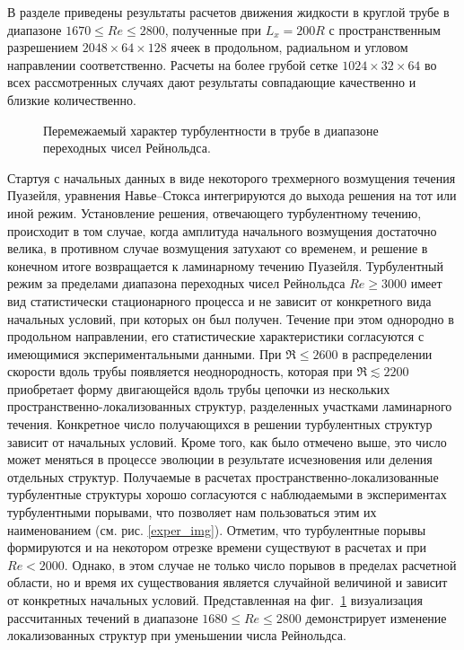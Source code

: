 В разделе приведены результаты расчетов движения жидкости в круглой трубе в диапазоне $1670\leqslant Re\leqslant 2800$, полученные при $L_x=200R$ с пространственным разрешением $2048 \times 64 \times 128$ ячеек в продольном, радиальном и угловом направлении соответственно. Расчеты на более грубой сетке $1024 \times 32 \times 64$ во всех рассмотренных случаях дают результаты совпадающие качественно и близкие количественно.

\begin{figure}[h]
\caption{Перемежаемый характер турбулентности в трубе в диапазоне переходных чисел Рейнольдса.}
\label{puffs_img}
\end{figure}

Стартуя с начальных данных в виде некоторого трехмерного возмущения течения Пуазейля, уравнения Навье--Стокса интегрируются до выхода решения на тот или иной режим. Установление решения, отвечающего турбулентному течению, происходит в том случае, когда амплитуда начального возмущения достаточно велика, в противном случае возмущения затухают со временем, и решение в конечном итоге возвращается к ламинарному течению Пуазейля. Турбулентный режим за пределами диапазона переходных чисел Рейнольдса $Re\geqslant3000$ имеет вид статистически стационарного процесса и не зависит от конкретного вида начальных условий, при которых он был получен. Течение при этом однородно в продольном направлении, его статистические характеристики согласуются с имеющимися экспериментальными данными. При $\Re\leqslant2600$ в распределении скорости вдоль трубы появляется неоднородность, которая при $\Re\lesssim2200$ приобретает форму двигающейся вдоль трубы цепочки из нескольких пространственно-локализованных структур, разделенных участками ламинарного течения. Конкретное число получающихся в решении турбулентных структур зависит от начальных условий. Кроме того, как было отмечено выше, это число может меняться в процессе эволюции в результате исчезновения или деления отдельных структур. Получаемые в расчетах пространственно-локализованные турбулентные структуры хорошо согласуются с наблюдаемыми в экспериментах турбулентными порывами, что позволяет нам пользоваться этим их наименованием (см. рис. \ref{exper_img}). Отметим, что турбулентные порывы формируются и на некотором отрезке времени существуют в расчетах и при $Re<2000$. Однако, в этом случае не только число порывов в пределах расчетной области, но и время их существования является случайной величиной и зависит от конкретных начальных условий. Представленная на фиг.~\ref{puffs_img} визуализация рассчитанных течений в диапазоне $1680\leqslant Re\leqslant2800$ демонстрирует изменение локализованных структур при уменьшении числа Рейнольдса.


